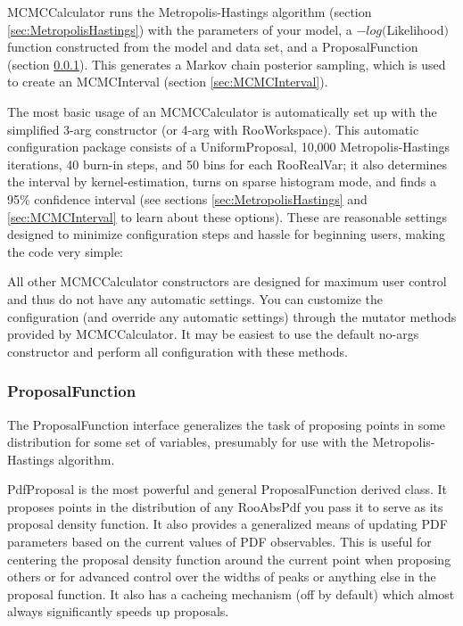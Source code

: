 \documentclass[11pt]{article}
\begin{document}
	MCMCCalculator runs the Metropolis-Hastings algorithm (section \ref{sec:MetropolisHastings}) with the parameters of your model, a $-log($Likelihood$)$ function constructed from the model and data set, and a ProposalFunction (section \ref{sec:ProposalFunction}).  This generates a Markov chain posterior sampling, which is used to create an MCMCInterval (section \ref{sec:MCMCInterval}).
	
	The most basic usage of an MCMCCalculator is automatically set up with the simplified 3-arg constructor (or 4-arg with RooWorkspace).  This automatic configuration package consists of  a UniformProposal, 10,000 Metropolis-Hastings iterations, 40 burn-in steps, and 50 bins for each RooRealVar; it also determines the interval by kernel-estimation, turns on sparse histogram mode, and finds a 95\% confidence interval (see sections \ref{sec:MetropolisHastings} and \ref{sec:MCMCInterval} to learn about these options).  These are reasonable settings designed to minimize configuration steps and hassle for beginning users, making the code very simple:
	
	
	
	All other MCMCCalculator constructors are designed for maximum user control and thus do not have any automatic settings.  You can customize the configuration (and override any automatic settings) through the mutator methods provided by MCMCCalculator.  It may be easiest to use the default no-args constructor and perform all configuration with these methods.
	
	
	
	\subsubsection{ProposalFunction}
	\label{sec:ProposalFunction}
	The ProposalFunction interface generalizes the task of proposing points in some distribution for some set of variables, presumably for use with the Metropolis-Hastings algorithm.
	
	PdfProposal is the most powerful and general ProposalFunction derived class.  It proposes points in the distribution of any RooAbsPdf you pass it to serve as its proposal density function.  It also provides a generalized means of updating PDF parameters based on the current values of PDF observables.  This is useful for centering the proposal density function around the current point when proposing others or for advanced control over the widths of peaks or anything else in the proposal function.  It also has a cacheing mechanism (off by default) which almost always significantly speeds up proposals.
	
\end{document}
